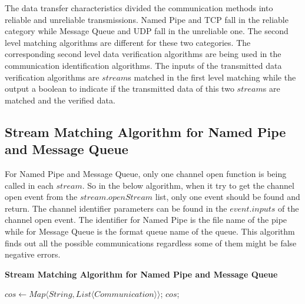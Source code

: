 The data transfer characteristics divided the communication methods into reliable and unreliable transmissions. Named Pipe and TCP fall in the reliable category while Message Queue and UDP fall in the unreliable one. The second level matching algorithms are different for these two categories. The corresponding second level data verification algorithms are being used in the communication identification algorithms. The inputs of the transmitted data verification algorithms are $stream$s matched in the first level matching while the output a boolean to indicate if the transmitted data of this two $stream$s are matched and the verified data.

\subsection{Stream Matching Algorithm for Named Pipe and Message Queue}
For Named Pipe and Message Queue, only one channel open function is being called in each $stream$. So in the below algorithm, when it try to get the channel open event from the $stream.openStream$ list, only one event should be found and return. The channel identifier parameters can be found in the $event.inputs$ of the channel open event. The identifier for Named Pipe is the file name of the pipe while for Message Queue is the format queue name of the queue. This algorithm finds out all the possible communications regardless some of them might be false negative errors. 

\begin{algorithm}[H]
\DontPrintSemicolon
\caption{{\bf Stream Matching Algorithm for Named Pipe and Message Queue} \label{channelAlg1}}
$cos \leftarrow Map \langle String, List \langle Communication \rangle \rangle$;\; 
\KwRet $cos$;\;
\end{algorithm} 


